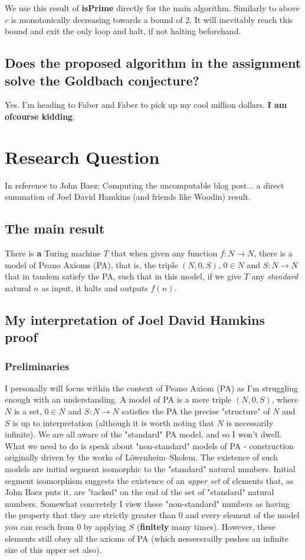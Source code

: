 \documentclass{article}
\begin{document}
We use this result of \textbf{isPrime} directly for the main algorithm. Similarly to above $c$ is monotonically decreasing towards a bound of 2. It will inevitably reach this bound and exit the only loop and halt, if not halting beforehand.

\subsection{Does the proposed algorithm in the assignment solve the Goldbach conjecture?}
Yes. I'm heading to Faber and Faber to pick up my cool million dollars. \textbf{I am ofcourse kidding}.

\pagebreak
\section{Research Question}
In reference to John Baez; Computing the uncomputable blog post... a direct summation of Joel David Hamkins (and friends like Woodin) result.

\subsection{The main result}
There is \textbf{a} Turing machine $T$ that when given any function $f: N \rightarrow N$, there is a model of Peano Axioms (PA), that is, the triple $(N, 0, S)$, $0 \in N$ and $S: N \rightarrow N$ that in tandem satisfy the PA, such that in this model, if we give $T$ any \emph{standard} natural $n$ as input, it halts and outputs $f(n)$.

\subsection{My interpretation of Joel David Hamkins proof}
\subsubsection{Preliminaries}
I personally will focus within the context of Peano Axiom (PA) as I'm struggling enough with an understanding. A model of PA is a mere triple $(N, 0, S)$, where $N$ is a set, $0 \in N$ and $S: N \rightarrow N$ satisfies the PA the precise "structure" of $N$ and $S$ is up to interpretation (although it is worth noting that $N$ is necessarily infinite). We are all aware of the "standard" PA model, and so I won't dwell. What we need to do is speak about "non-standard" models of PA - construction originally driven by the works of Löwenheim–Skolem. The existence of such models are initial segment isomorphic to the "standard" natural numbers. Initial segment isomorphism suggests the existence of an \emph{upper set} of elements that, as John Baez puts it, are "tacked" on the end of the set of "standard" natural numbers. Somewhat concretely I view these "non-standard" numbers as having the property that they are strictly greater than $0$ and every element of the model you can reach from 0 by applying $S$ (\textbf{finitely} many times). However, these elements still obey all the axioms of PA (which nessecerailly pushes an infinite size of this upper set also).
\end{document}
